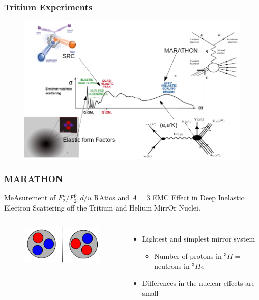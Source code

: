 \documentclass[12pt]{beamer}
\begin{document}
\begin{frame}
\frametitle{Tritium Experiments}
\vspace*{-25pt}
\begin{figure}
	\includegraphics[width =12cm]{../images/tritium_ov}
\end{figure}
\end{frame}
\begin{frame}
\frametitle{MARATHON}
\vspace{-10pt}
\begin{block}{}
MeAsurement of $F^n_2/F^p_2, d/u$ RAtios and $A=3$ EMC Effect in Deep Inelastic Electron Scattering off the Tritium and Helium MirrOr Nuclei.
\vspace{-10pt}
\begin{columns}[t]
	
	\vspace{-10pt}	
	\hspace{-10pt}
	\begin{figure}
		\includegraphics[width =5cm]{../images/mirror}
	\end{figure}
	
	\vspace{10pt}
	\begin{itemize}
		\item Lightest and simplest mirror system
		\begin{itemize}
			\item  Number of protons in $^3H =$ neutrons in $^3He$
		\end{itemize}
		\item Differences in the nuclear effects are small
	\end{itemize}
	
	
\end{columns}
\end{block}
\end{frame}
\end{document}
